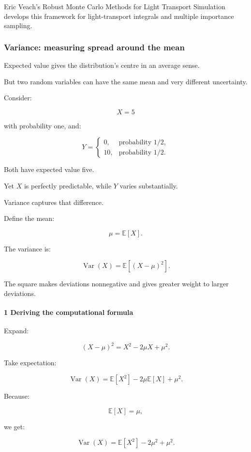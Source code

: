 Eric Veach's Robust Monte Carlo Methods for Light Transport Simulation develops this framework for light-transport integrals and multiple importance sampling.

\subsubsection{Variance: measuring spread around the mean}\label{variance-measuring-spread-around-the-mean}

Expected value gives the distribution's centre in an average sense.

But two random variables can have the same mean and very different uncertainty.

Consider:

\[
 X=5
\]

with probability one, and:

\[
 Y= \begin{cases} 0,&\text{probability }1/2,\\ 10,&\text{probability }1/2. \end{cases}
\]

Both have expected value five.

Yet \(X\) is perfectly predictable, while \(Y\) varies substantially.

Variance captures that difference.

Define the mean:

\[
 \mu=\mathbb E[X].
\]

The variance is:

\[
 \boxed{ \operatorname{Var}(X)= \mathbb E[(X-\mu)^2] }.
\]

The square makes deviations nonnegative and gives greater weight to larger deviations.

\paragraph{1 Deriving the computational formula}\label{deriving-the-computational-formula}

Expand:

\[
 (X-\mu)^2=X^2-2\mu X+\mu^2.
\]

Take expectation:

\[
 \operatorname{Var}(X) = \mathbb E[X^2] -2\mu\mathbb E[X] +\mu^2.
\]

Because:

\[
 \mathbb E[X]=\mu,
\]

we get:

\[
 \operatorname{Var}(X) = \mathbb E[X^2]-2\mu^2+\mu^2.
\]

